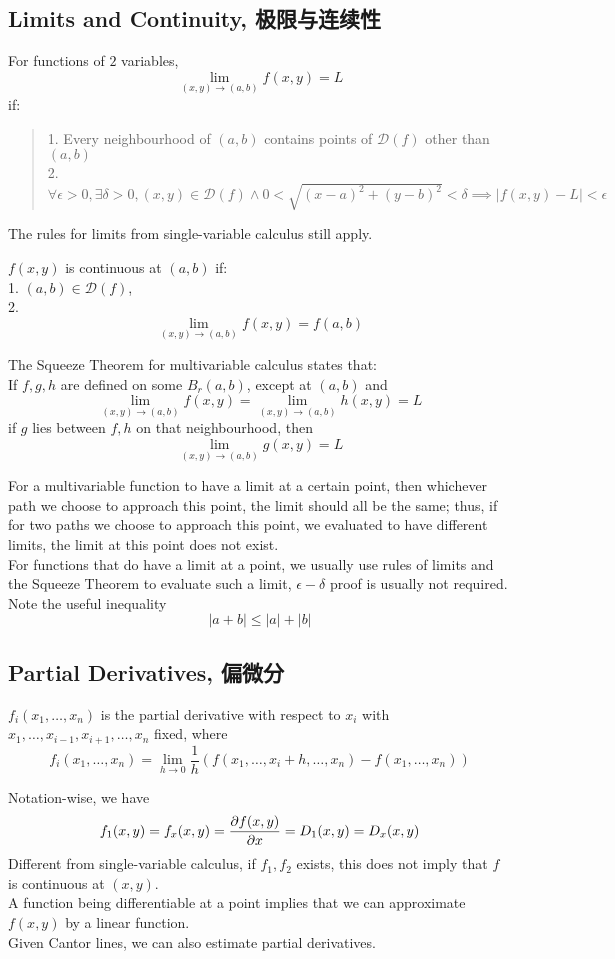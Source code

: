 \subsection{Limits and Continuity, 极限与连续性}
For functions of $2$ variables, 
$$\lim_{(x, y) \to (a, b)} f(x, y) = L$$
if:
\begin{quote}
    1. Every neighbourhood of $(a, b)$ contains points of $\mathscr{D}(f)$ other than $(a, b)$ \\
    2. $\forall \epsilon  > 0, \exists \delta > 0, (x, y) \in \mathscr{D}(f) \land 0 < \sqrt{(x-a)^2 + (y-b)^2} < \delta \implies |f(x, y) - L| < \epsilon$
\end{quote}
The rules for limits from single-variable calculus still apply.
\begin{definition}
    $f(x, y)$ is continuous at $(a, b)$ if: \\
    1. $(a, b) \in \mathscr{D}(f)$, \\
    2. $$\lim_{(x, y) \to (a, b)} f(x, y) = f(a, b)$$
\end{definition}
\begin{theorem}
    The Squeeze Theorem for multivariable calculus states that: \\
    If $f, g, h$ are defined on some $B_r(a, b)$, except at $(a, b)$ and
    $$\lim_{(x, y) \to (a, b)} f(x, y) = \lim_{(x, y) \to (a, b)} h(x, y) = L$$
    if $g$ lies between $f, h$ on that neighbourhood, then
    $$\lim_{(x, y) \to (a, b)} g(x, y) = L$$
\end{theorem}
For a multivariable function to have a limit at a certain point, then whichever path we choose to approach this point, the limit should all be the same; thus, if for two paths we choose to approach this point, we evaluated to have different limits, the limit at this point does not exist. \\
For functions that do have a limit at a point, we usually use rules of limits and the Squeeze Theorem to evaluate such a limit, $\epsilon-\delta$ proof is usually not required. \\
Note the useful inequality
$$|a+b| \le |a| + |b|$$

\subsection{Partial Derivatives, 偏微分}
\begin{definition}
    $f_i(x_1, \dots, x_n)$ is the partial derivative with respect to $x_i$ with $x_1, \dots, x_{i-1}, x_{i+1}, \dots, x_n$ fixed, where
    $$f_i(x_1, \dots, x_n) = \lim_{h \to 0} \frac{1}{h} (f(x_1, \dots, x_i + h, \dots, x_n) - f(x_1, \dots, x_n))$$
\end{definition}
Notation-wise, we have
$$f_1(x, y) = f_x(x, y) = \pdv{f(x, y)}{x} = D_1(x, y) = D_x(x, y)$$
Different from single-variable calculus, if $f_1, f_2$ exists, this does not imply that $f$ is continuous at $(x, y)$. \\
A function being differentiable at a point implies that we can approximate $f(x, y)$ by a linear function. \\
Given Cantor lines, we can also estimate partial derivatives.

